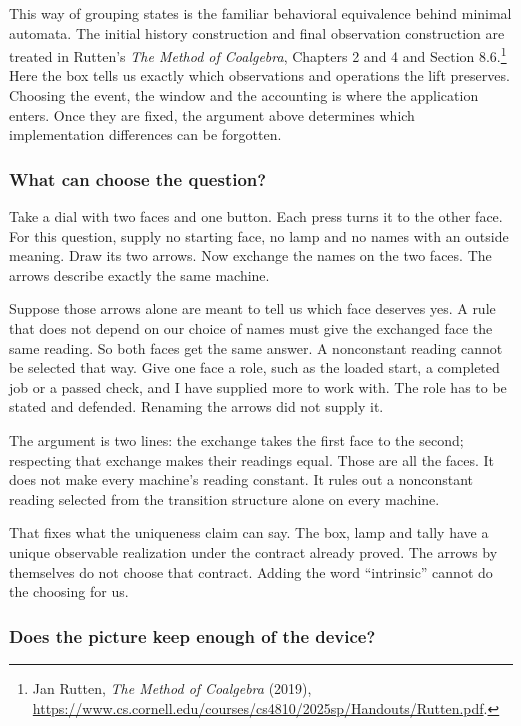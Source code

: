 \documentclass[11pt,twoside]{article}
\theoremstyle{thielethm}
\theoremstyle{thieledef}
\theoremstyle{thieledef}
\theoremstyle{thieledef}
\theoremstyle{thielethm}
\theoremstyle{thieleobs}
\theoremstyle{thielethm}
\begin{document}
This way of grouping states is the familiar behavioral equivalence behind
minimal automata. The initial history construction and final observation
construction are treated in Rutten's \emph{The Method of Coalgebra},
Chapters 2 and 4 and Section 8.6.\footnote{Jan Rutten, \emph{The Method of
Coalgebra} (2019), \url{https://www.cs.cornell.edu/courses/cs4810/2025sp/Handouts/Rutten.pdf}.}
Here the box tells us exactly which observations and operations the lift
preserves. Choosing the event, the window and the accounting is where the
application enters. Once they are fixed, the argument above determines
which implementation differences can be forgotten.


\subsubsection*{What can choose the question?}

Take a dial with two faces and one button. Each press turns it to the other
face. For this question, supply no starting face, no lamp and no names with
an outside meaning. Draw its two arrows. Now exchange the names on the two
faces. The arrows describe exactly the same machine.

Suppose those arrows alone are meant to tell us which face deserves yes.
A rule that does not depend on our choice of names must give the exchanged
face the same reading. So both faces get the same answer. A nonconstant
reading cannot be selected that way. Give one face a role, such as the loaded
start, a completed job or a passed check, and I have supplied more to work
with. The role has to be stated and defended. Renaming the arrows did not
supply it.

The argument is two lines: the exchange takes the first face to the second;
respecting that exchange makes their readings equal. Those are all the
faces. It does not make every machine's reading constant. It rules out a
nonconstant reading selected from the transition structure alone on every
machine. 

That fixes what the uniqueness claim can say. The box, lamp and tally have
a unique observable realization under the contract already proved. The
arrows by themselves do not choose that contract. Adding the word
``intrinsic'' cannot do the choosing for us.

\subsubsection*{Does the picture keep enough of the device?}
\end{document}
